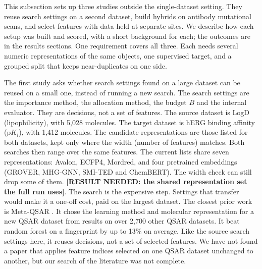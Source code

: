 
This subsection sets up three studies outside the single-dataset setting. They reuse search settings on a second dataset, build hybrids on antibody mutational scans, and select features with data held at separate sites. We describe how each setup was built and scored, with a short background for each; the outcomes are in the results sections. One requirement covers all three. Each needs several numeric representations of the same objects, one supervised target, and a grouped split that keeps near-duplicates on one side.

The first study asks whether search settings found on a large dataset can be reused on a small one, instead of running a new search. The search settings are the importance method, the allocation method, the budget $B$ and the internal evaluator. They are decisions, not a set of features. The source dataset is LogD (lipophilicity), with 5,028 molecules. The target dataset is hERG binding affinity ($\mathrm{p}K_i$), with 1,412 molecules. The candidate representations are those listed for both datasets, kept only where the width (number of features) matches. Both searches then range over the same features. The current lists share seven representations: Avalon, ECFP4, Mordred, and four pretrained embeddings (GROVER, MHG-GNN, SMI-TED and ChemBERT). The width check can still drop some of them. \textbf{[RESULT NEEDED: the shared representation set the full run uses]}. The search is the expensive step. Settings that transfer would make it a one-off cost, paid on the largest dataset. The closest prior work is Meta-QSAR \citep{Olier2018}. It chose the learning method and molecular representation for a new QSAR dataset from results on over 2,700 other QSAR datasets. It beat random forest on a fingerprint by up to 13\% on average. Like the source search settings here, it reuses decisions, not a set of selected features. We have not found a paper that applies feature indices selected on one QSAR dataset unchanged to another, but our search of the literature was not complete.

